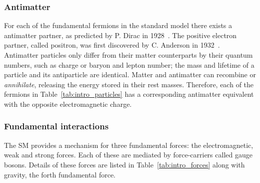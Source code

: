 

\subsubsection{Antimatter}

For each of the fundamental fermions in the standard model there exists a antimatter partner, as predicted by P. Dirac in 1928~\cite{Dirac610}. The positive electron partner, called positron, was first discovered by C. Anderson in 1932~\cite{PhysRev.43.491}.
Antimatter particles only differ from their matter counterparts by their quantum numbers, such as charge or baryon and lepton number; the mass and lifetime of a particle and its antiparticle are identical. Matter and antimatter can recombine or \emph{annihilate}, releasing the energy stored in their rest masses. 
Therefore, each of the fermions in Table~\ref{tab:intro_particles} has a corresponding antimatter equivalent with the opposite electromagnetic charge.  

\subsubsection{Fundamental interactions}

The SM provides a mechanism for three fundamental forces: the electromagnetic, weak and strong forces. Each of these are mediated by force-carriers called gauge bosons.
Details of these forces are listed in Table~\ref{tab:intro_forces} along with gravity, the forth fundamental force. 

